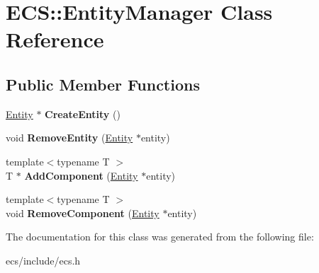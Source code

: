 \hypertarget{class_e_c_s_1_1_entity_manager}{\section{E\-C\-S\-:\-:Entity\-Manager Class Reference}
\label{class_e_c_s_1_1_entity_manager}
}
\subsection*{Public Member Functions}
\begin{DoxyCompactItemize}
\item 
\hypertarget{class_e_c_s_1_1_entity_manager_a5029d8ac52b5e171acf9f98d6513e87b}{\hyperlink{class_e_c_s_1_1_entity}{Entity} $\ast$ {\bfseries Create\-Entity} ()}\label{class_e_c_s_1_1_entity_manager_a5029d8ac52b5e171acf9f98d6513e87b}

\item 
\hypertarget{class_e_c_s_1_1_entity_manager_ab469ce55513336256b521a8af38faeca}{void {\bfseries Remove\-Entity} (\hyperlink{class_e_c_s_1_1_entity}{Entity} $\ast$entity)}\label{class_e_c_s_1_1_entity_manager_ab469ce55513336256b521a8af38faeca}

\item 
\hypertarget{class_e_c_s_1_1_entity_manager_a4c1d473501404323a532524f6afcbdfb}{{\footnotesize template$<$typename T $>$ }\\T $\ast$ {\bfseries Add\-Component} (\hyperlink{class_e_c_s_1_1_entity}{Entity} $\ast$entity)}\label{class_e_c_s_1_1_entity_manager_a4c1d473501404323a532524f6afcbdfb}

\item 
\hypertarget{class_e_c_s_1_1_entity_manager_a3ffccf0260e106f39192872cf2cd47a0}{{\footnotesize template$<$typename T $>$ }\\void {\bfseries Remove\-Component} (\hyperlink{class_e_c_s_1_1_entity}{Entity} $\ast$entity)}\label{class_e_c_s_1_1_entity_manager_a3ffccf0260e106f39192872cf2cd47a0}

\end{DoxyCompactItemize}


The documentation for this class was generated from the following file\-:\begin{DoxyCompactItemize}
\item 
ecs/include/ecs.\-h\end{DoxyCompactItemize}
